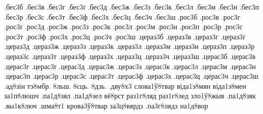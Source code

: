 {.бес3б
.бес3в
.бес3г
.бес3ґ
.бес3д
.бес3ж
.бес3з
.бес3к
.бес3л
.бес3м
.бес3н
.бес3п
.бес3р
.бес3с
.бес3т
.бес3ф
.бес3х
.бес3ц
.бес3ч
.бес3ш
.рос3б
.рос3в
.рос3г
.рос3ґ
.рос3д
.рос3ж
.рос3з
.рос3к
.рос3л
.рос3м
.рос3н
.рос3п
.рос3р
.рос3с
.рос3т
.рос3ф
.рос3х
.рос3ц
.рос3ч
.рос3ш
.цераз3б
.цераз3в
.цераз3г
.цераз3ґ
.цераз3д
.цераз3ж
.цераз3з
.цераз3к
.цераз3л
.цераз3м
.цераз3н
.цераз3п
.цераз3р
.цераз3с
.цераз3т
.цераз3ф
.цераз3х
.цераз3ц
.цераз3ч
.цераз3ш
.церас3б
.церас3в
.церас3г
.церас3ґ
.церас3д
.церас3ж
.церас3з
.церас3к
.церас3л
.церас3м
.церас3н
.церас3п
.церас3р
.церас3с
.церас3т
.церас3ф
.церас3х
.церас3ц
.церас3ч
.церас3ш
.ад8зін
тэ8мбр.
8льш.
8сць.
8дзь.
.дву8х3
слова1ў8твар
віда1з8мян
віда1з8мен
за1п8люшч
.па1д8зял
.па1д8зел
вё8рст
раз1г8ляд
раз1г8лед
зло1ў8жыв
.па1д8зяк
.вы1к8люч
.шма8т1
крова3ў8твар
за3ц8вярдз
.па3г8лядз
на1д8вор
}

